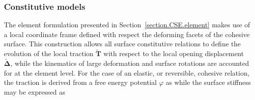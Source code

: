 \subsubsection{Constitutive models}
\label{section.CSE.laws}
The element formulation presented in Section~\ref{section.CSE.element}
makes use of a local coordinate frame defined with respect the 
deforming facets of the cohesive surface. This construction allows 
all surface constitutive relations to define the evolution of
the local traction $\tilde{\mathbf{T}}$ 
with respect to the local opening displacement
$\tilde{\boldsymbol{\Delta}}$, 
while the kinematics of large deformation and surface rotations are 
accounted for at the element level.
For the case of an elastic, or reversible, cohesive relation, the 
traction is derived from a free energy
potential $\varphi$ as
while the surface stiffness may be expressed as

